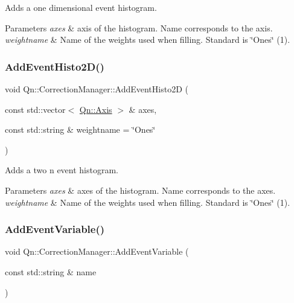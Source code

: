 Adds a one dimensional event histogram. 


\begin{DoxyParams}{Parameters}
{\em axes} & axis of the histogram. Name corresponds to the axis. \\
\hline
{\em weightname} & Name of the weights used when filling. Standard is \char`\"{}\+Ones\char`\"{} (1). \\
\hline
\end{DoxyParams}
\mbox{\label{classQn_1_1CorrectionManager_a85fdc9a031c498ba8385329aab2833bc}} 
\subsubsection{\texorpdfstring{Add\+Event\+Histo2\+D()}{AddEventHisto2D()}}
{\footnotesize\ttfamily void Qn\+::\+Correction\+Manager\+::\+Add\+Event\+Histo2D (\begin{DoxyParamCaption}\item[{const std\+::vector$<$ \mbox{\hyperlink{classQn_1_1Axis}{Qn\+::\+Axis}} $>$ \&}]{axes,  }\item[{const std\+::string \&}]{weightname = {\ttfamily \char`\"{}Ones\char`\"{}} }\end{DoxyParamCaption})}



Adds a two n event histogram. 


\begin{DoxyParams}{Parameters}
{\em axes} & axes of the histogram. Name corresponds to the axes. \\
\hline
{\em weightname} & Name of the weights used when filling. Standard is \char`\"{}\+Ones\char`\"{} (1). \\
\hline
\end{DoxyParams}
\mbox{\label{classQn_1_1CorrectionManager_a90640b93699ad1550136bd53a5ef39f9}} 
\subsubsection{\texorpdfstring{Add\+Event\+Variable()}{AddEventVariable()}}
{\footnotesize\ttfamily void Qn\+::\+Correction\+Manager\+::\+Add\+Event\+Variable (\begin{DoxyParamCaption}\item[{const std\+::string \&}]{name }\end{DoxyParamCaption})\hspace{0.3cm}{\ttfamily [inline]}}

